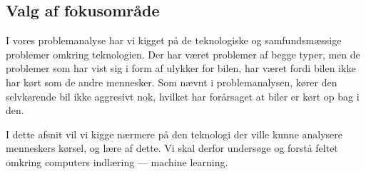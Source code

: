 \subsection{Valg af fokusområde}
I vores problemanalyse har vi kigget på de teknologiske og samfundsmæssige problemer omkring teknologien. Der har været problemer af begge typer, men de problemer som har vist sig i form af ulykker for bilen, har været fordi bilen ikke har kørt som de andre mennesker. Som nævnt i problemanalysen, kører den selvkørende bil ikke aggresivt nok, hvilket har forårsaget at biler er kørt op bag i den\cite{VOX}.

I dette afsnit vil vi kigge nærmere på den teknologi der ville kunne analysere menneskers kørsel, og lære af dette. Vi skal derfor undersøge og forstå feltet omkring computers indlæring --- machine learning.